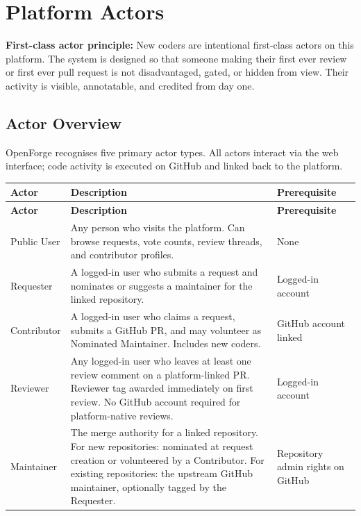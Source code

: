 \documentclass[12pt,a4paper]{article}
\begin{document}
\section{Platform Actors}

\begin{successbox}
\textbf{First-class actor principle:} New coders are intentional first-class actors on this platform. The system is designed so that someone making their first ever review or first ever pull request is not disadvantaged, gated, or hidden from view. Their activity is visible, annotatable, and credited from day one.
\end{successbox}

\subsection{Actor Overview}
OpenForge recognises five primary actor types. All actors interact via the web interface; code activity is executed on GitHub and linked back to the platform.

\begin{longtable}{L{2.8cm} L{7.5cm} L{3cm}}
  \color{white}\bfseries Actor & \color{white}\bfseries Description & \color{white}\bfseries Prerequisite \\
  \endfirsthead
  \color{white}\bfseries Actor & \color{white}\bfseries Description & \color{white}\bfseries Prerequisite \\
  \endhead\hline
  Public User  & Any person who visits the platform. Can browse requests, vote counts, review threads, and contributor profiles. & None \\
  Requester    & A logged-in user who submits a request and nominates or suggests a maintainer for the linked repository. & Logged-in account \\
  Contributor  & A logged-in user who claims a request, submits a GitHub PR, and may volunteer as Nominated Maintainer. Includes new coders. & GitHub account linked \\
  Reviewer     & Any logged-in user who leaves at least one review comment on a platform-linked PR. Reviewer tag awarded immediately on first review. No GitHub account required for platform-native reviews. & Logged-in account \\
  Maintainer   & The merge authority for a linked repository. For new repositories: nominated at request creation or volunteered by a Contributor. For existing repositories: the upstream GitHub maintainer, optionally tagged by the Requester. & Repository admin rights on GitHub \\
  \hline
\end{longtable}
\end{document}
